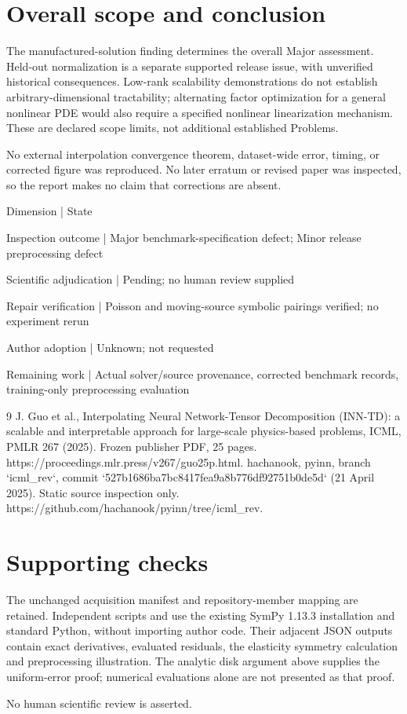 \documentclass[10pt]{article}
\begin{document}
\section*{Overall scope and conclusion}
The manufactured-solution finding determines the overall Major assessment. Held-out normalization is a separate supported release issue, with unverified historical consequences. Low-rank scalability demonstrations do not establish arbitrary-dimensional tractability; alternating factor optimization for a general nonlinear PDE would also require a specified nonlinear linearization mechanism. These are declared scope limits, not additional established Problems.\par
No external interpolation convergence theorem, dataset-wide error, timing, or corrected figure was reproduced. No later erratum or revised paper was inspected, so the report makes no claim that corrections are absent.\par
Dimension | State\par
Inspection outcome | Major benchmark-specification defect; Minor release preprocessing defect\par
Scientific adjudication | Pending; no human review supplied\par
Repair verification | Poisson and moving-source symbolic pairings verified; no experiment rerun\par
Author adoption | Unknown; not requested\par
Remaining work | Actual solver/source provenance, corrected benchmark records, training-only preprocessing evaluation\par
9 J. Guo et al., Interpolating Neural Network-Tensor Decomposition (INN-TD): a scalable and interpretable approach for large-scale physics-based problems, ICML, PMLR 267 (2025). Frozen publisher PDF, 25 pages. https://proceedings.mlr.press/v267/guo25p.html. hachanook, pyinn, branch `icml\_rev`, commit `527b1686ba7bc8417fea9a8b776df92751b0de5d` (21 April 2025). Static source inspection only. https://github.com/hachanook/pyinn/tree/icml\_rev.\par
\section*{Supporting checks}
The unchanged acquisition manifest and repository-member mapping are retained. Independent scripts and use the existing SymPy 1.13.3 installation and standard Python, without importing author code. Their adjacent JSON outputs contain exact derivatives, evaluated residuals, the elasticity symmetry calculation and preprocessing illustration. The analytic disk argument above supplies the uniform-error proof; numerical evaluations alone are not presented as that proof.\par
No human scientific review is asserted.\par
\end{document}
